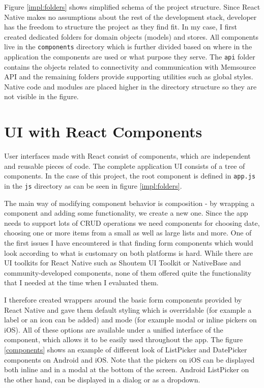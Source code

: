 Figure \ref{impl:folders} shows simplified schema of the project structure. Since React Native makes no assumptions about the rest of the development stack, developer has the freedom to structure the project as they find fit. In my case, I first created dedicated folders for domain objects (models) and stores. All components live in the \texttt{components} directory which is further divided based on where in the application the components are used or what purpose they serve. The \texttt{api} folder contains the objects related to connectivity and communication with Memsource API and the remaining folders provide supporting utilities such as global styles. Native code and modules are placed higher in the directory structure so they are not visible in the figure.


\section{UI with React Components}

User interfaces made with React consist of components, which are independent and reusable pieces of code. The complete application UI consists of a tree of components. In the case of this project, the root component is defined in \texttt{app.js} in the \texttt{js} directory as can be seen in figure \ref{impl:folders}.

The main way of modifying component behavior is composition - by wrapping a component and adding some functionality, we create a new one. Since the app needs to support lots of CRUD operations we need components for choosing date, choosing one or more items from a small as well as large lists and more. One of the first issues I have encountered is that finding form components which would look according to what is customary on both platforms is hard. While there are UI toolkits for React Native such as Shoutem UI Toolkit or NativeBase and community-developed components, none of them offered quite the functionality that I needed at the time when I evaluated them.

I therefore created wrappers around the basic form components provided by React Native and gave them default styling which is overridable (for example a label or an icon can be added) and mode (for example modal or inline pickers on iOS). All of these options are available under a unified interface of the component, which allows it to be easily used throughout the app. The figure \ref{components} shows an example of different look of ListPicker and DatePicker components on Android and iOS. Note that the pickers on iOS can be displayed both inline and in a modal at the bottom of the screen. Android ListPicker on the other hand, can be displayed in a dialog or as a dropdown.

